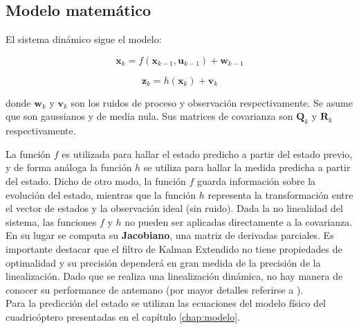 \documentclass[main]{subfiles}
\begin{document}
\subsection{Modelo matemático}

El sistema dinámico sigue el modelo:

$$\mathbf{x}_{k} = f(\mathbf{x}_{k-1}, \mathbf{u}_{k-1}) + \mathbf{w}_{k-1}$$

$$\mathbf{z}_{k} = h(\mathbf{x}_{k}) + \mathbf{v}_{k}$$

donde $\mathbf{w}_k$ y $\mathbf{v}_k$ son los ruidos de proceso y observación respectivamente. Se asume que son gaussianos y de media nula. Sus matrices de covarianza son $\mathbf{Q}_k$ y $\mathbf{R}_k$ respectivamente.

La función $f$ es utilizada para hallar el estado predicho a partir del estado previo, y de forma análoga la función $h$ se utiliza para hallar la medida predicha a partir del estado. Dicho de otro modo, la función $f$ guarda información sobre la evolución del estado, mientras que la función $h$ representa la transformación entre el vector de estados y la observación ideal (sin ruido). Dada la no linealidad del sistema, las funciones $f$ y $h$ no pueden ser aplicadas directamente a la covarianza. En su lugar se computa su \textbf{Jacobiano}, una matriz de derivadas parciales. Es importante destacar que el filtro de Kalman Extendido no tiene propiedades de optimalidad y su precisión dependerá en gran medida de la precisión de la linealización. Dado que se realiza una linealización dinámica, no hay manera de conocer su performance de antemano (por mayor detalles referirse a \cite{bib:kay}).\\
Para la predicción del estado se utilizan las ecuaciones del modelo físico del cuadricóptero presentadas en el capítulo \ref{chap:modelo}.\\
\end{document}
